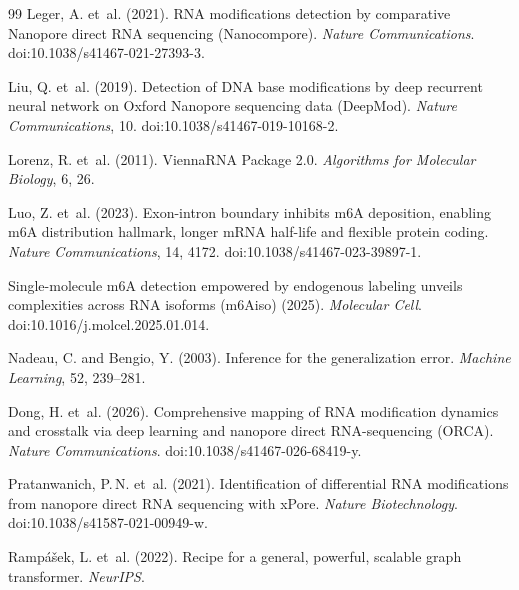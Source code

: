 \documentclass[11pt,a4paper]{article}
\begin{document}
\begin{thebibliography}{99}
    Leger, A. et~al. (2021).
    \newblock RNA modifications detection by comparative Nanopore direct RNA sequencing (Nanocompore).
    \newblock \textit{Nature Communications}. doi:10.1038/s41467-021-27393-3.

    Liu, Q. et~al. (2019).
    \newblock Detection of DNA base modifications by deep recurrent neural network on Oxford Nanopore sequencing data (DeepMod).
    \newblock \textit{Nature Communications}, 10. doi:10.1038/s41467-019-10168-2.

    Lorenz, R. et~al. (2011).
    \newblock ViennaRNA Package 2.0.
    \newblock \textit{Algorithms for Molecular Biology}, 6, 26.

    Luo, Z. et~al. (2023).
    \newblock Exon-intron boundary inhibits m6A deposition, enabling m6A distribution hallmark, longer mRNA half-life and flexible protein coding.
    \newblock \textit{Nature Communications}, 14, 4172. doi:10.1038/s41467-023-39897-1.

    Single-molecule m6A detection empowered by endogenous labeling unveils complexities across RNA isoforms (m6Aiso) (2025).
    \newblock \textit{Molecular Cell}. doi:10.1016/j.molcel.2025.01.014.

    Nadeau, C. and Bengio, Y. (2003).
    \newblock Inference for the generalization error.
    \newblock \textit{Machine Learning}, 52, 239--281.

    Dong, H. et~al. (2026).
    \newblock Comprehensive mapping of RNA modification dynamics and crosstalk via deep learning and nanopore direct RNA-sequencing (ORCA).
    \newblock \textit{Nature Communications}. doi:10.1038/s41467-026-68419-y.

    Pratanwanich, P.\,N. et~al. (2021).
    \newblock Identification of differential RNA modifications from nanopore direct RNA sequencing with xPore.
    \newblock \textit{Nature Biotechnology}. doi:10.1038/s41587-021-00949-w.

    Rampášek, L. et~al. (2022).
    \newblock Recipe for a general, powerful, scalable graph transformer.
    \newblock \textit{NeurIPS}.


\end{thebibliography}
\end{document}
